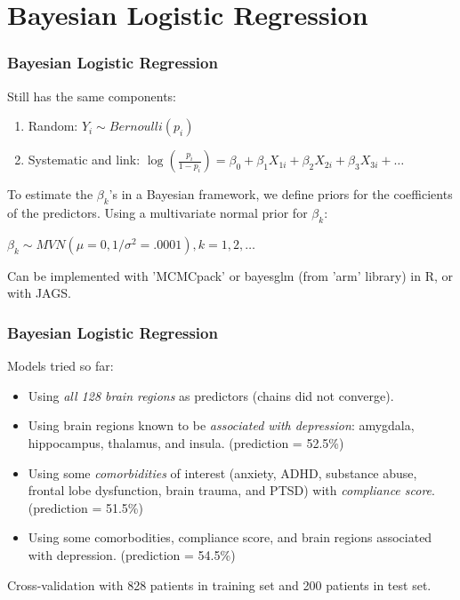 \documentclass{beamer}
\begin{document}
\section{Bayesian Logistic Regression} 


\begin{frame}
\frametitle{Bayesian Logistic Regression}
Still has the same components:
\begin{enumerate}
\item Random: $Y_{i} \sim Bernoulli \left( p_{i} \right) $
\item Systematic and link: $ \log \left( \frac{p_{i}}{1-p_{i}} \right) = \beta_{0} + \beta_{1}X_{1i} + \beta_{2}X_{2i} + \beta_{3}X_{3i} + \ldots $
\end{enumerate}

To estimate the $\beta_{k}$'s in a Bayesian framework, we define priors for the coefficients of the predictors. Using a multivariate normal prior for $\beta_{k}$:
\medskip
\begin{center}
$ \beta_{k} \sim MVN \left( \mu = 0, 1/\sigma^{2} = .0001  \right), k = 1,2, \ldots $
\end{center}

Can be implemented with 'MCMCpack' or bayesglm (from 'arm' library) in R, or with JAGS.

\end{frame}


\begin{frame}

\frametitle{Bayesian Logistic Regression}
Models tried so far:
\begin{itemize}
\item Using \emph{all 128 brain regions} as predictors (chains did not converge).
\item Using brain regions known to be \emph{associated with depression}: amygdala, hippocampus, thalamus, and insula. (prediction = 52.5\%)
\item Using some \emph{comorbidities} of interest (anxiety, ADHD, substance abuse, frontal lobe dysfunction, brain trauma, and PTSD) with \emph{compliance score}. (prediction = 51.5\%)
\item Using some comorbodities, compliance score, and brain regions associated with depression. (prediction = 54.5\%)
\end{itemize}
\medskip
Cross-validation with 828 patients in training set and 200 patients in test set.

\end{frame}
\end{document}
